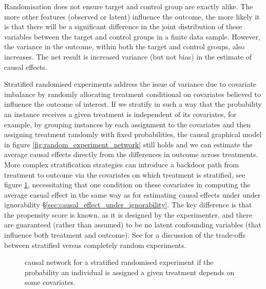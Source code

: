 \documentclass[11pt,a4paper,oneside]{book}
\theoremstyle{plain}
\theoremstyle{definition}
\begin{document}
Randomisation does not ensure target and control group are exactly alike. The more other features (observed or latent) influence the outcome, the more likely it is that there will be a significant difference in the joint distribution of these variables between the target and control groups in a finite data sample. However, the variance in the outcome, within both the target and control groups, also increases. The net result is increased variance (but not bias) in  the estimate of causal effects. 

Stratified randomised experiments address the issue of variance due to covariate imbalance by randomly allocating treatment conditional on covariates believed to influence the outcome of interest. If we stratify in such a way that the probability an instance receives a given treatment is independent of its covariates, for example, by grouping instances by each assignment to the covariates and then assigning treatment randomly with fixed probabilities, the causal graphical model in figure \ref{fig:random_experiment_network} still holds and we can estimate the average causal effects directly from the differences in outcome across treatments. More complex stratification strategies can introduce a backdoor path from treatment to outcome via the covariates on which treatment is stratified, see figure \ref{fig:random_experiment_network_stratified}, necessitating that one condition on these covariates in computing the average casual effect in the same way as for estimating causal effects under under ignorability \S\ref{sec:causal_effect_under_ignorability}. The key difference is that the propensity score is known, as it is designed by the experimenter, and there are guaranteed (rather than assumed) to be no latent confounding variables (that influence both treatment and outcome). See \citet{imbens2015causal} for a discussion of the trade-offs between stratified versus completely random experiments. 

\begin{figure}
\centering
{}
\caption{causal network for a stratified randomised experiment if the probability an individual is assigned a given treatment depends on some covariates.}
\label{fig:random_experiment_network_stratified}
\end{figure} 
\end{document}
